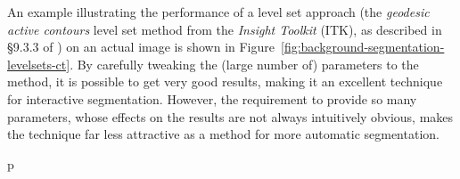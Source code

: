 An example illustrating the performance of a level set approach (the \emph{geodesic active contours} level set method from the \emph{Insight Toolkit} (ITK), as described in \S9.3.3 of \cite{itk}) on an actual image is shown in Figure~\ref{fig:background-segmentation-levelsets-ct}. By carefully tweaking the (large number of) parameters to the method, it is possible to get very good results, making it an excellent technique for interactive segmentation. However, the requirement to provide so many parameters, whose effects on the results are not always intuitively obvious, makes the technique far less attractive as a method for more automatic segmentation.

\begin{stusubfig}{p}
	\hspace{4mm}%
	\\

\end{stusubfig}
